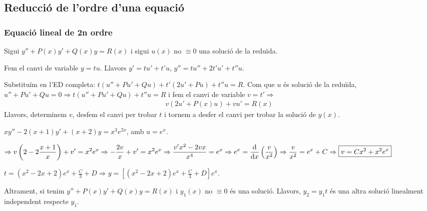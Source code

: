 
\subsection{Reducció de l'ordre d'una equació}
\subsubsection*{Equació lineal de 2n ordre}
Sigui $y'' + P(x) y' + Q(x) y = R(x)$ i sigui $u(x)$ no $\equiv 0$ una solució de la reduïda.

Fem el canvi de variable $\boxed{y = tu}$. Llavors $y' = tu' + t'u$, $y'' = tu'' + 2t'u' + t''u$.

Substituïm en l'ED completa: $t(u'' + Pu' + Qu) + t'(2u' + Pu) + t'' u = R$. Com que $u$ és solució de la reduïda, $u'' + Pu' + Qu = 0 \Rightarrow t(u'' + Pu' + Qu) + t'' u = R$ i fem el canvi de variable $\boxed{v = t'} \Rightarrow$
\begin{align}
    \boxed{v(2u' +P(x)u) + vu' = R(x)}
\end{align}
Llavors, determinem $v$, desfem el canvi per trobar $t$ i tornem a desfer el canvi per trobar la solució de $y(x)$.
\begin{example}
$x y'' - 2 (x + 1) y' + (x+2) y = x^{3} e^{2x}$, amb $u = e^{x}$.

$\displaystyle \Rightarrow v \left( 2 - 2 \frac{x + 1}{x} \right) + v' = x^{2} e^{x} \Rightarrow - \frac{2v}{x} + v' = x^{2} e^{x} \Rightarrow \frac{v' x^{2} - 2vx}{x^{4}} = e^{x} \Rightarrow e^{x} = \frac{\mathrm{d}}{\mathrm{d} x} \left( \frac{v}{x^{2}} \right) \Rightarrow \frac{v}{x^{2}} = e^{x} + C \Rightarrow \boxed{v = C x^{2} + x^{2} e^{x}}$

$\displaystyle t = (x^{2} - 2x + 2) e^{x} + \frac{C}{3} + D \Rightarrow \boxed{ y = \left[ (x^{2} - 2x + 2)e^{x} + \frac{C}{3} + D \right] e^{x}}$.
\end{example}
Altrament, si tenim $y'' + P(x) y' + Q(x) y = R(x)$ i $y_{1}(x)$ no $\equiv 0$ és una solució. Llavors, $y_{2} = y_{1} t$ és una altra solució linealment independent respecte $y_{1}$.

